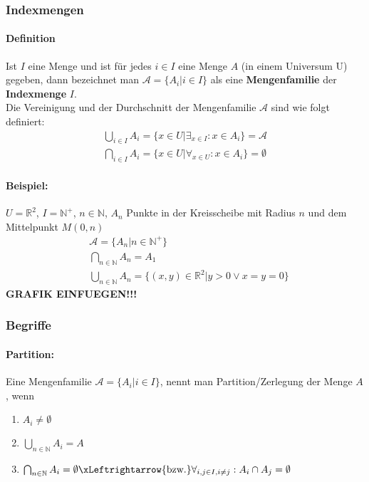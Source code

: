 \subsubsection{Indexmengen}
\paragraph{Definition}Ist $I$ eine Menge und ist für jedes $i\in I$ eine Menge $A$ (in einem Universum U) gegeben, dann bezeichnet man
$\mathcal{A}=\{A_i|i\in I\}$ als eine \textbf{Mengenfamilie} der \textbf{Indexmenge} $I$.\\
Die Vereinigung und der Durchschnitt der Mengenfamilie $\mathcal{A}$ sind wie folgt definiert:
\begin{align*}
\bigcup_{i\in I} A_i = \{x\in U | \exists_{x\in I}: x\in A_i\}=\mathcal{A} \\
\bigcap_{i\in I} A_i = \{x\in U | \forall_{x\in U}: x\in A_i\} =\emptyset
\end{align*}

\paragraph{Beispiel:} $U=\mathbb{R}^2$, $I=\mathbb{N}^+$, $n\in\mathbb{N}$, $A_n$ Punkte in der Kreisscheibe mit Radius $n$ und dem Mittelpunkt $M(0,n)$
\begin{align*}
&\mathcal{A}=\{A_n|n\in \mathbb{N}^+\} \\
&\bigcap_{n\in\mathbb{N}}A_n=A_1 \\
&\bigcup_{n\in\mathbb{N}}A_n=\{ (x,y)\in\mathbb{R}^2 | y>0 \lor x=y=0\}
\end{align*}
\textbf{GRAFIK EINFUEGEN!!!}
\subsubsection{Begriffe}
\paragraph{Partition:}Eine Mengenfamilie $\mathcal{A}=\{A_i | i\in I\}$, nennt man Partition/Zerlegung der Menge $A$, wenn
\begin{enumerate}
\item $A_i \neq \emptyset$
\item $\bigcup_{n\in\mathbb{N}}A_i=A$
\item $\bigcap_{n\in\mathbb{N}}A_i=\emptyset \xLeftrightarrow{\text{bzw.}} \forall_{i,j\in I,i\neq j}:A_i\cap A_j=\emptyset$
\end{enumerate}
